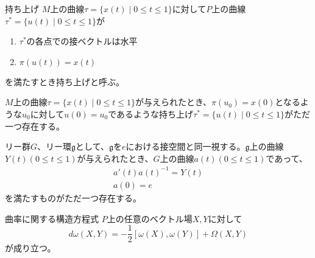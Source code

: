 \begin{dfn}{持ち上げ}
	$M$上の曲線$\tau = \{x(t) \mid 0 \leq t \leq 1\}$に対して$P$上の曲線$\tau^{*} = \{u(t) \mid 0 \leq t \leq 1\}$が
	\begin{enumerate}
		\item $\tau^{*}$の各点での接ベクトルは水平
		\item $\pi(u(t)) = x(t)$
	\end{enumerate}
	を満たすとき持ち上げと呼ぶ。
\end{dfn}
\begin{thm}
	$M$上の曲線$\tau = \{x(t) \mid 0 \leq t \leq 1\}$が与えられたとき、$\pi(u_0) = x(0)$となるような$u_0$に対して$u(0) = u_0$であるような持ち上げ$\tau^{*} = \{u(t) \mid 0 \leq t \leq 1\}$がただ一つ存在する。
\end{thm}
\begin{thm}
	リー群$G$、リー環$\mathfrak{g}$として、$\mathfrak{g}$を$e$における接空間と同一視する。$\mathfrak{g}$上の曲線$Y(t)(0 \leq t \leq 1)$が与えられたとき、$G$上の曲線$a(t)(0 \leq t \leq 1)$であって、
	\begin{align*}
		a'(t)a(t)^{-1} = Y(t)\\
		a(0) = e
	\end{align*}
	を満たすものがただ一つ存在する。
\end{thm}

\begin{thm}{曲率に関する構造方程式}
	$P$上の任意のベクトル場$X, Y$に対して
		\[d\omega(X, Y) = -\frac{1}{2}[\omega(X), \omega(Y)] + \Omega(X, Y)\]
	が成り立つ。
\end{thm}
